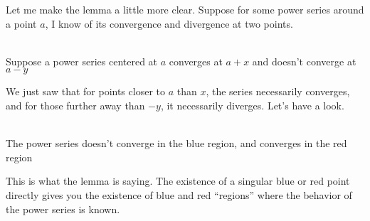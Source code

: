 Let me make the lemma a little more clear. Suppose for some power series around a point $a$, I know of its convergence and divergence at two points.
\begin{center}
\\
Suppose a power series centered at $a$ converges at $a + x$ and doesn't converge at $a-y$
\end{center}
We just saw that for points closer to $a$ than $x$, the series necessarily converges, and for those further away than $-y$, it necessarily diverges. Let's have a look.
\begin{center}
\\
The power series doesn't converge in the blue region, and converges in the red region
\end{center}
This is what the lemma is saying. The existence of a singular blue or red point directly gives you the existence of blue and red ``regions'' where the behavior of the power series is known.

